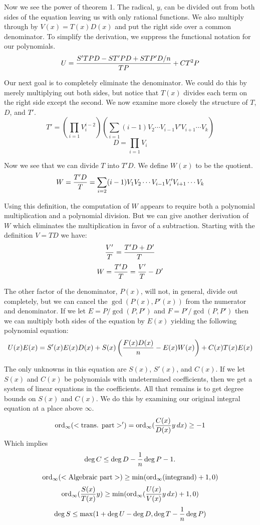 Now we see the power of theorem 1.  The radical, $y$, can be divided out
from both sides of the equation leaving us with only rational functions.
We also multiply through by $V(x) = T(x)D(x)$ and put the right side
over a common denominator.  To simplify the derivation, we
suppress the functional notation for our polynomials.
\[
U = {S'TPD - S T' P D + S T P' D/n \over TP}
+ C T^2 P
\]

Our next goal is to completely eliminate the denominator.  We could
do this by merely multiplying out both sides, but notice that $T(x)$
divides each term on the right side except the second.  We now
examine more closely the structure of $T$, $D$, and $T'$.
\[
T' = \left(\prod_{i=1} V_i^{i-2}\right)
\left(\sum_{i=1} (i -1) V_2 \cdots V_{i-1}V' V_{i+1} \cdots
V_k \right)
\]
\[
D = \prod_{i=1} V_i
\]

Now we see that we can divide $T$ into $T'D$.  We define $W(x)$ to
be the quotient.
\[
W = {T' D \over T} =
\sum_{i=2} (i-1) V_1 V_2 \cdots V_{i-1} V'_i V_{i+1} \cdots V_k
\]

Using this definition, the computation of $W$ appears to require 
both a polynomial multiplication and a polynomial division.  But
we can give another derivation of $W$ which eliminates the
multiplication in favor of a subtraction.  Starting with the definition
$V = TD$ we have:
\[
{V' \over T} = {T' D + D' \over T}
\]
\[
W = {T' D \over T} = {V' \over T} - D'
\]

The other factor of the denominator, $P(x)$, will not, in general,
divide out completely, but we can cancel the $\gcd(P(x),P'(x))$
from the numerator and denominator.  If we let $E = P/\gcd(P,P')$ and
$F = P'/\gcd(P,P')$ then we can multiply both sides of the
equation by $E(x)$ yielding the following polynomial equation:
\[
U(x)E(x) = S'(x)E(x)D(x) + 
S(x)\left({F(x)D(x)\over n} - E(x)W(x)\right) + C(x)T(x)E(x)
\]

The only unknowns in this equation are $S(x)$, $S'(x)$, and $C(x)$.
If we let $S(x)$ and $C(x)$ be polynomials with undetermined coefficients,
then we get a system of linear equations in the coefficients.  All that 
remains is to get degree bounds on $S(x)$ and $C(x)$.  We do this by
examining our original integral equation at a place above $\infty$.
\[
\mathop{\rm ord}\nolimits_{\infty}(<\hbox{trans. part}>') 
= \mathop{\rm ord}\nolimits_{\infty}({C(x) \over D(x)} y\,dx) \ge -1
\]
Which implies
\[
\deg C \le \deg D - {1 \over n} \deg P -1.
\]

\[
\mathop{\rm ord}\nolimits_{\infty}(<\hbox{Algebraic part}>) \ge
\min(\mathop{\rm ord}\nolimits_{\infty}(\hbox{integrand})+1,0)
\]
\[
\mathop{\rm ord}\nolimits_{\infty}({S(x) \over T(x)} y) \ge 
\min(\mathop{\rm ord}\nolimits_{\infty}({U(x) \over V(x)}y\,dx)+1,0)
\]
\[
\deg S \le \max(1+\deg U - \deg D, \deg T - {1 \over n}\deg P)
\]

